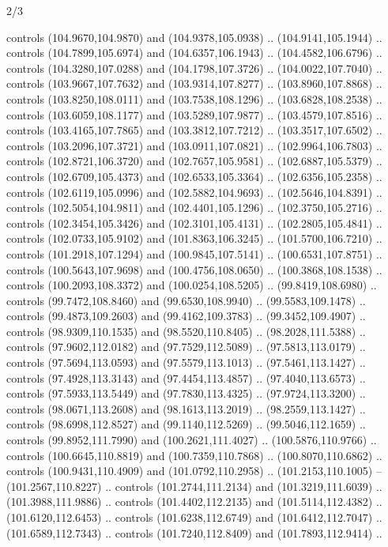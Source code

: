 \begin{flagdescription}{2/3}
\begin{scope}[shift={(0.5\flaglength,0.5)},scale=\flagwidth/320]
\begin{scope}[y=0.8pt, x=0.8pt, yscale=-1,shift={(-118.3,-146)}]
  controls (104.9670,104.9870) and (104.9378,105.0938) .. (104.9141,105.1944) ..
  controls (104.7899,105.6974) and (104.6357,106.1943) .. (104.4582,106.6796) ..
  controls (104.3280,107.0288) and (104.1798,107.3726) .. (104.0022,107.7040) ..
  controls (103.9667,107.7632) and (103.9314,107.8277) .. (103.8960,107.8868) ..
  controls (103.8250,108.0111) and (103.7538,108.1296) .. (103.6828,108.2538) ..
  controls (103.6059,108.1177) and (103.5289,107.9877) .. (103.4579,107.8516) ..
  controls (103.4165,107.7865) and (103.3812,107.7212) .. (103.3517,107.6502) ..
  controls (103.2096,107.3721) and (103.0911,107.0821) .. (102.9964,106.7803) ..
  controls (102.8721,106.3720) and (102.7657,105.9581) .. (102.6887,105.5379) ..
  controls (102.6709,105.4373) and (102.6533,105.3364) .. (102.6356,105.2358) ..
  controls (102.6119,105.0996) and (102.5882,104.9693) .. (102.5646,104.8391) ..
  controls (102.5054,104.9811) and (102.4401,105.1296) .. (102.3750,105.2716) ..
  controls (102.3454,105.3426) and (102.3101,105.4131) .. (102.2805,105.4841) ..
  controls (102.0733,105.9102) and (101.8363,106.3245) .. (101.5700,106.7210) ..
  controls (101.2918,107.1294) and (100.9845,107.5141) .. (100.6531,107.8751) ..
  controls (100.5643,107.9698) and (100.4756,108.0650) .. (100.3868,108.1538) ..
  controls (100.2093,108.3372) and (100.0254,108.5205) .. (99.8419,108.6980) ..
  controls (99.7472,108.8460) and (99.6530,108.9940) .. (99.5583,109.1478) ..
  controls (99.4873,109.2603) and (99.4162,109.3783) .. (99.3452,109.4907) ..
  controls (98.9309,110.1535) and (98.5520,110.8405) .. (98.2028,111.5388) ..
  controls (97.9602,112.0182) and (97.7529,112.5089) .. (97.5813,113.0179) ..
  controls (97.5694,113.0593) and (97.5579,113.1013) .. (97.5461,113.1427) ..
  controls (97.4928,113.3143) and (97.4454,113.4857) .. (97.4040,113.6573) ..
  controls (97.5933,113.5449) and (97.7830,113.4325) .. (97.9724,113.3200) ..
  controls (98.0671,113.2608) and (98.1613,113.2019) .. (98.2559,113.1427) ..
  controls (98.6998,112.8527) and (99.1140,112.5269) .. (99.5046,112.1659) ..
  controls (99.8952,111.7990) and (100.2621,111.4027) .. (100.5876,110.9766) ..
  controls (100.6645,110.8819) and (100.7359,110.7868) .. (100.8070,110.6862) ..
  controls (100.9431,110.4909) and (101.0792,110.2958) .. (101.2153,110.1005) --
  (101.2567,110.8227) .. controls (101.2744,111.2134) and (101.3219,111.6039) ..
  (101.3988,111.9886) .. controls (101.4402,112.2135) and (101.5114,112.4382) ..
  (101.6120,112.6453) .. controls (101.6238,112.6749) and (101.6412,112.7047) ..
  (101.6589,112.7343) .. controls (101.7240,112.8409) and (101.7893,112.9414) ..

\end{scope}
\end{scope}
\end{flagdescription}
